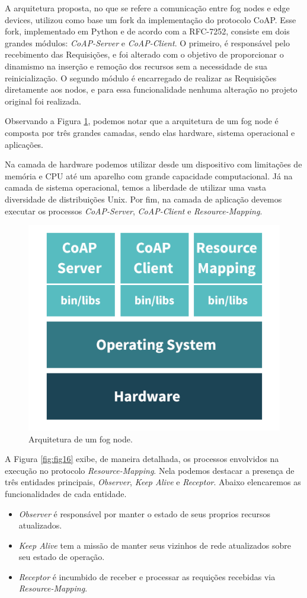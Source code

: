 A arquitetura proposta, no que se refere a comunicação entre fog nodes e edge devices, utilizou como base um fork da implementação do protocolo CoAP\cite{coapimpl:2018}.
Esse fork, implementado em Python e de acordo com a RFC-7252, consiste em dois grandes módulos: \textit{CoAP-Server} e \textit{CoAP-Client}.
O primeiro, é responsável pelo recebimento das Requisições, e foi alterado com o objetivo de proporcionar o dinamismo na inserção e remoção dos recursos sem a necessidade de sua reinicialização.
O segundo módulo é encarregado de realizar as Requisições diretamente aos nodos, e para essa funcionalidade nenhuma alteração no projeto original foi realizada.


Observando a Figura \ref{fig:fig15}, podemos notar que a arquitetura de um fog node é composta por três grandes camadas, sendo elas hardware, sistema operacional e aplicações.

Na camada de hardware podemos utilizar desde um dispositivo com limitações de memória e CPU até um aparelho com grande capacidade computacional.
Já na camada de sistema operacional, temos a liberdade de utilizar uma vasta diversidade de distribuições Unix.
Por fim, na camada de aplicação devemos executar os processos \textit{CoAP-Server}, \textit{CoAP-Client} e \textit{Resource-Mapping}.

\begin{figure}[H]
    \centering\includegraphics[width=.5\textwidth]{fig15.png}
    \caption[Arquitetura de um fog node]
    {\label{fig:fig15} Arquitetura de um fog node.}
\end{figure}

A Figura \ref{fig:fig16} exibe, de maneira detalhada, os processos envolvidos na execução no protocolo \textit{Resource-Mapping}.
Nela podemos destacar a presença de três entidades principais, \textit{Observer}, \textit{Keep Alive} e \textit{Receptor}.
Abaixo elencaremos as funcionalidades de cada entidade.

\begin{itemize}
    \item \textit{Observer} é responsável por manter o estado de seus proprios recursos atualizados.
    \item \textit{Keep Alive} tem a missão de manter seus vizinhos de rede atualizados sobre seu estado de operação.
    \item \textit{Receptor} é incumbido de receber e processar as requições recebidas via \textit{Resource-Mapping}.
\end{itemize}

